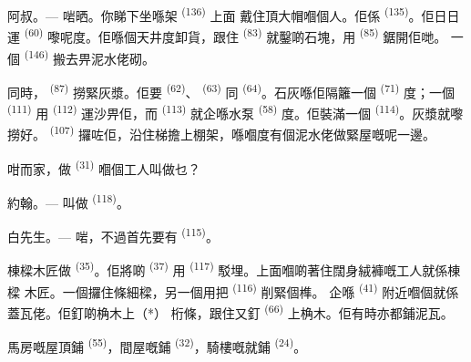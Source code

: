 \textsc{阿叔}。--- 啱晒。你睇下坐喺架 \textsuperscript{(136)} 上面
戴住頂大帽嗰個人。佢係 \textsuperscript{(135)}。佢日日運
\textsuperscript{(60)} 嚟呢度。佢喺個天井度卸貨，跟住
\textsuperscript{(83)} 就鑿啲石塊，用 \textsuperscript{(85)} 鋸開佢哋。
一個 \textsuperscript{(146)} 搬去畀泥水佬砌。

同時， \textsuperscript{(87)} 撈緊灰漿。佢要
\textsuperscript{(62)}、 \textsuperscript{(63)} 同
\textsuperscript{(64)}。石灰喺佢隔籬一個 \textsuperscript{(71)} 度；一個
 \textsuperscript{(111)} 用 \textsuperscript{(112)}
運沙畀佢，而 \textsuperscript{(113)} 就企喺水泵 \textsuperscript{(58)}
度。佢裝滿一個 \textsuperscript{(114)}。灰漿就嚟撈好。
\textsuperscript{(107)} 攞咗佢，沿住梯擔上棚架，喺嗰度有個泥水佬做緊屋嘅呢一邊。

咁而家，做 \textsuperscript{(31)} 嗰個工人叫做乜？

\textsc{約翰}。--- 叫做 \textsuperscript{(118)}。

\VUsaut{3.0mm}
\VUsaut{3.0mm}

\textsc{白先生}。--- 啱，不過首先要有 \textsuperscript{(115)}。

棟樑木匠做 \textsuperscript{(35)}。佢將啲 \textsuperscript{(37)}
用 \textsuperscript{(117)} 駁埋。上面嗰啲著住闊身絨褲嘅工人就係棟樑
木匠。一個攞住條細樑，另一個用把 \textsuperscript{(116)} 削緊個榫。
企喺 \textsuperscript{(41)} 附近嗰個就係蓋瓦佬。佢釘啲桷木上（*）
桁條，跟住又釘 \textsuperscript{(66)} 上桷木。佢有時亦都鋪泥瓦。


馬房嘅屋頂鋪 \textsuperscript{(55)}，間屋嘅鋪
\textsuperscript{(32)}，騎樓嘅就鋪 \textsuperscript{(24)}。

